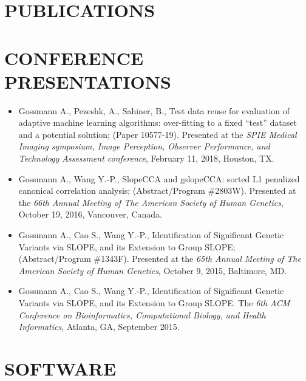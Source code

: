 \documentclass[overlapped, line, 10pt]{res} %
\begin{document}
\begin{resume}

\section{PUBLICATIONS}





\section{CONFERENCE PRESENTATIONS}

\begin{itemize}
  \item
    Gossmann A., Pezeshk, A., Sahiner, B., Test data reuse for evaluation of adaptive machine learning algorithms: over-fitting to a fixed ``test'' dataset and a potential solution;
    (Paper 10577-19).
    Presented at the \textit{SPIE Medical Imaging symposium, Image Perception, Observer Performance, and Technology Assessment conference},
    February 11, 2018, Houston, TX.
  \item
    Gossmann A., Wang Y.-P., SlopeCCA and gslopeCCA: sorted L1 penalized canonical correlation analysis;
    (Abstract/Program \#2803W).
    Presented at the \textit{66th Annual Meeting of The American Society of Human Genetics},
    October 19, 2016, Vancouver, Canada.
  \item
    Gossmann A., Cao S., Wang Y.-P., Identification of Significant Genetic Variants via SLOPE, and its Extension to Group SLOPE;
    (Abstract/Program \#1343F).
    Presented at the \textit{65th Annual Meeting of The American Society of Human Genetics},
    October 9, 2015, Baltimore, MD.
  \item
    Gossmann A., Cao S., Wang Y.-P., Identification of Significant Genetic Variants via SLOPE, and its Extension to Group SLOPE.
    The \textit{6th ACM Conference on Bioinformatics, Computational Biology, and Health Informatics},
    Atlanta, GA, September 2015.
\end{itemize}


\section{SOFTWARE}


\end{resume}
\end{document}
